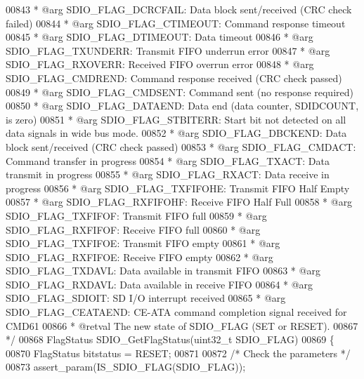 \begin{DoxyCode}
00843 \textcolor{comment}{  *            @arg SDIO\_FLAG\_DCRCFAIL: Data block sent/received (CRC check failed)}
00844 \textcolor{comment}{  *            @arg SDIO\_FLAG\_CTIMEOUT: Command response timeout}
00845 \textcolor{comment}{  *            @arg SDIO\_FLAG\_DTIMEOUT: Data timeout}
00846 \textcolor{comment}{  *            @arg SDIO\_FLAG\_TXUNDERR: Transmit FIFO underrun error}
00847 \textcolor{comment}{  *            @arg SDIO\_FLAG\_RXOVERR:  Received FIFO overrun error}
00848 \textcolor{comment}{  *            @arg SDIO\_FLAG\_CMDREND:  Command response received (CRC check passed)}
00849 \textcolor{comment}{  *            @arg SDIO\_FLAG\_CMDSENT:  Command sent (no response required)}
00850 \textcolor{comment}{  *            @arg SDIO\_FLAG\_DATAEND:  Data end (data counter, SDIDCOUNT, is zero)}
00851 \textcolor{comment}{  *            @arg SDIO\_FLAG\_STBITERR: Start bit not detected on all data signals in wide bus mode.}
00852 \textcolor{comment}{  *            @arg SDIO\_FLAG\_DBCKEND:  Data block sent/received (CRC check passed)}
00853 \textcolor{comment}{  *            @arg SDIO\_FLAG\_CMDACT:   Command transfer in progress}
00854 \textcolor{comment}{  *            @arg SDIO\_FLAG\_TXACT:    Data transmit in progress}
00855 \textcolor{comment}{  *            @arg SDIO\_FLAG\_RXACT:    Data receive in progress}
00856 \textcolor{comment}{  *            @arg SDIO\_FLAG\_TXFIFOHE: Transmit FIFO Half Empty}
00857 \textcolor{comment}{  *            @arg SDIO\_FLAG\_RXFIFOHF: Receive FIFO Half Full}
00858 \textcolor{comment}{  *            @arg SDIO\_FLAG\_TXFIFOF:  Transmit FIFO full}
00859 \textcolor{comment}{  *            @arg SDIO\_FLAG\_RXFIFOF:  Receive FIFO full}
00860 \textcolor{comment}{  *            @arg SDIO\_FLAG\_TXFIFOE:  Transmit FIFO empty}
00861 \textcolor{comment}{  *            @arg SDIO\_FLAG\_RXFIFOE:  Receive FIFO empty}
00862 \textcolor{comment}{  *            @arg SDIO\_FLAG\_TXDAVL:   Data available in transmit FIFO}
00863 \textcolor{comment}{  *            @arg SDIO\_FLAG\_RXDAVL:   Data available in receive FIFO}
00864 \textcolor{comment}{  *            @arg SDIO\_FLAG\_SDIOIT:   SD I/O interrupt received}
00865 \textcolor{comment}{  *            @arg SDIO\_FLAG\_CEATAEND: CE-ATA command completion signal received for CMD61}
00866 \textcolor{comment}{  * @retval The new state of SDIO\_FLAG (SET or RESET).}
00867 \textcolor{comment}{  */}
00868 FlagStatus SDIO_GetFlagStatus(uint32\_t SDIO\_FLAG)
00869 \{
00870   FlagStatus bitstatus = RESET;
00871 
00872   \textcolor{comment}{/* Check the parameters */}
00873   assert_param(IS\_SDIO\_FLAG(SDIO\_FLAG));

\end{DoxyCode}
